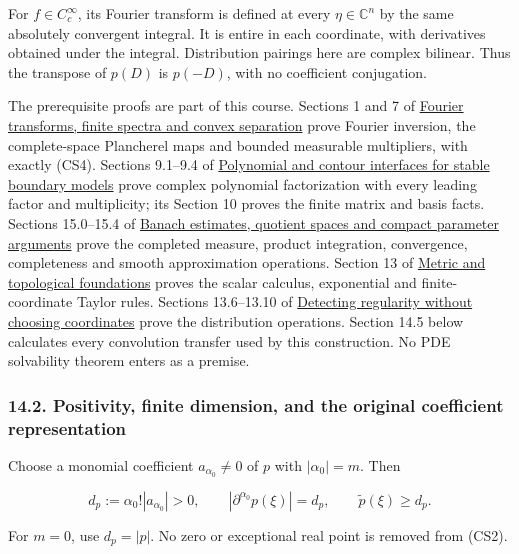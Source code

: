 \documentclass[
  11pt,
]{article}
\makeatletter
\let\ReaderOriginalAnchorStart\hyper@anchorstart
\let\ReaderOriginalAnchorEnd\hyper@anchorend
\let\ReaderPendingAliases\@empty
\def\ReaderArmAliases#1{\gdef\ReaderPendingAliases{#1}}
\def\hyper@anchorstart#1{\ReaderIfNativeAnchorTF{#1}{\ReaderPendingAliases\global\let\ReaderPendingAliases\@empty}{}\ReaderOriginalAnchorStart{#1}}
\makeatother
\begin{document}
For \(f\in C_c^\infty\), its Fourier transform is defined at every
\(\eta\in\mathbb C^n\) by the same absolutely convergent integral. It is
entire in each coordinate, with derivatives obtained under the integral.
Distribution pairings here are complex bilinear. Thus the transpose of
\(p(D)\) is \(p(-D)\), with no coefficient conjugation.

The prerequisite proofs are part of this course. Sections 1 and 7 of
\href{prerequisite-bridges.pdf}{Fourier
transforms, finite spectra and convex separation} prove Fourier
inversion, the complete-space Plancherel maps and bounded measurable
multipliers, with exactly (CS4). Sections 9.1--9.4 of
\href{stable-prerequisite-bridges.pdf}{Polynomial
and contour interfaces for stable boundary models} prove complex
polynomial factorization with every leading factor and multiplicity; its
Section 10 proves the finite matrix and basis facts. Sections 15.0--15.4
of
\href{banach-foundation-bridges.pdf}{Banach
estimates, quotient spaces and compact parameter arguments} prove the
completed measure, product integration, convergence, completeness and
smooth approximation operations. Section 13 of
\href{metric-foundation-bridges.pdf}{Metric
and topological foundations} proves the scalar calculus, exponential and
finite-coordinate Taylor rules. Sections 13.6--13.10 of
\href{geometric-microlocal-calculus.pdf}{Detecting regularity without
choosing coordinates} prove the distribution operations. Section 14.5
below calculates every convolution transfer used by this construction.
No PDE solvability theorem enters as a premise.

\ReaderArmAliases{\ReaderOriginalAnchorStart{positivity-finite-dimension-and-the-original-coefficient-representation}\ReaderOriginalAnchorEnd}
\subsubsection{14.2. Positivity, finite dimension, and the original
coefficient
representation}\label{positivity-finite-dimension-and-the-original-coefficient-representation}

Choose a monomial coefficient \(a_{\alpha_0}\neq0\) of \(p\) with
\(|\alpha_0|=m\). Then

\[
 d_p:=\alpha_0!|a_{\alpha_0}|>0,
 \qquad |\partial^{\alpha_0}p(\xi)|=d_p,
 \qquad \widetilde p(\xi)\geq d_p.                              \tag{CS5}
\]

For \(m=0\), use \(d_p=|p|\). No zero or exceptional real point is
removed from (CS2).
\end{document}
